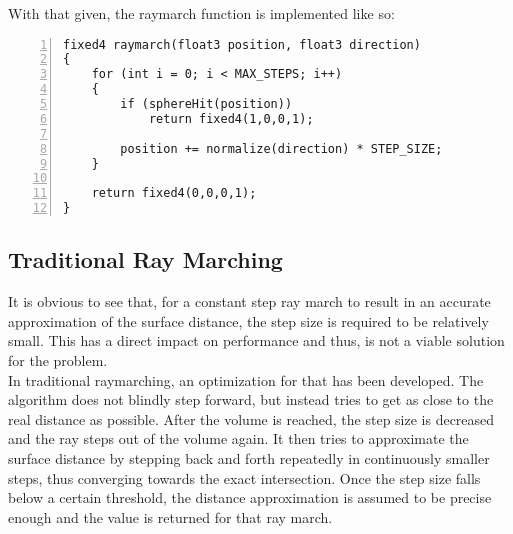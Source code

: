 \noindent
With that given, the raymarch function is implemented like so:

\begin{lstlisting}[language=HLSL, numbers=left, caption=Implementation of a ray march function with constant step.,captionpos=b, label=lst:shader:raymarch:constantstep]
fixed4 raymarch(float3 position, float3 direction)
{
    for (int i = 0; i < MAX_STEPS; i++)
    {
        if (sphereHit(position))
            return fixed4(1,0,0,1);
        
        position += normalize(direction) * STEP_SIZE;
    }
    
    return fixed4(0,0,0,1);
}
\end{lstlisting}


\pagebreak
\subsection{Traditional Ray Marching}
It is obvious to see that, for a constant step ray march to result in an accurate approximation of the surface distance, the step size is required to be relatively small.
This has a direct impact on performance and thus, is not a viable solution for the problem.
\\
In traditional \gls{raymarching}, an optimization for that has been developed. The algorithm does not blindly step forward, but instead tries to get as close to the real distance as possible.
After the volume is reached, the step size is decreased and the ray steps out of the volume again. It then tries to approximate the surface distance by stepping back and forth repeatedly in continuously smaller steps, thus converging towards the exact intersection.
Once the step size falls below a certain threshold, the distance approximation is assumed to be precise enough and the value is returned for that ray march.

